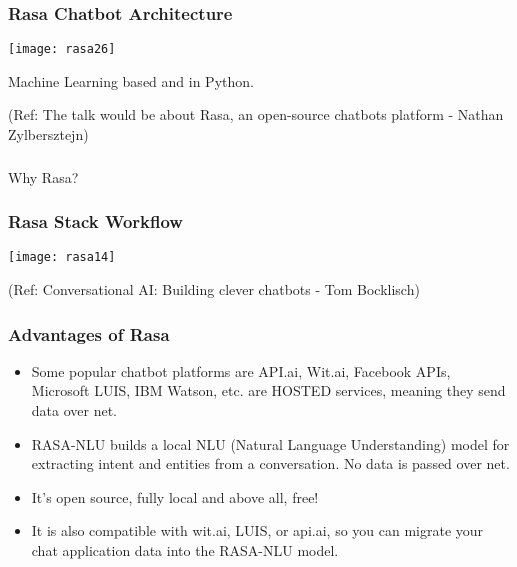 \begin{frame}[fragile]\frametitle{Rasa Chatbot Architecture}


\begin{center}
\texttt{[image: rasa26]}
\end{center}

Machine Learning based and in Python.

{\tiny (Ref: The talk would be about Rasa, an open-source chatbots platform - Nathan Zylbersztejn)}

\end{frame}


\begin{frame}[fragile]\frametitle{}
\begin{center}
{\Large Why Rasa?}
\end{center}
\end{frame}

\begin{frame}[fragile]\frametitle{Rasa Stack Workflow}


\begin{center}
\texttt{[image: rasa14]}
\end{center}


{\tiny (Ref: Conversational AI: Building clever chatbots - Tom Bocklisch)}

\end{frame}


 \begin{frame}[fragile]\frametitle{Advantages of Rasa}
\begin{itemize}
\item Some popular chatbot platforms are API.ai, Wit.ai, Facebook APIs, Microsoft LUIS, IBM Watson, etc. are HOSTED services, meaning they send data over net.
\item RASA-NLU builds a local NLU (Natural Language Understanding) model for extracting intent and entities from a conversation. No data is passed over net.
\item It’s open source, fully local and above all, free! 
\item It is also compatible with wit.ai, LUIS, or api.ai, so you can migrate your chat application data into the RASA-NLU model.
\end{itemize}
\end{frame}

